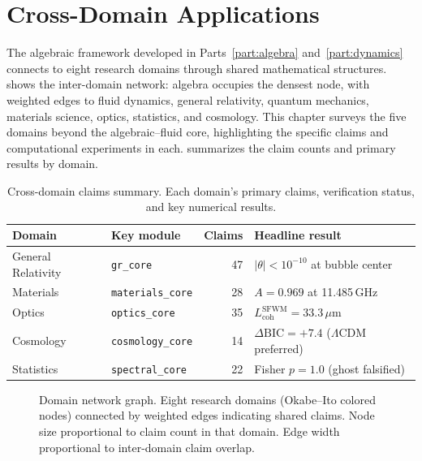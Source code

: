 \documentclass[12pt,openany]{report}
\theoremstyle{definition}
\theoremstyle{plain}
\theoremstyle{remark}
\begin{document}
\chapter{Cross-Domain Applications}
\label{ch:domains}

The algebraic framework developed in Parts~\ref{part:algebra}
and~\ref{part:dynamics} connects to eight research domains through
shared mathematical structures.   shows the
inter-domain network: algebra occupies the densest node, with weighted
edges to fluid dynamics, general relativity, quantum mechanics,
materials science, optics, statistics, and cosmology.  This chapter
surveys the five domains beyond the algebraic--fluid core, highlighting
the specific claims and computational experiments in each.
 summarizes the claim counts and primary
results by domain.

\begin{table}[htbp]
\centering
\caption{Cross-domain claims summary.  Each domain's primary claims,
verification status, and key numerical results.}
\label{tab:domain-summary}
\begin{tabular}{llrl}
\toprule
\textbf{Domain} & \textbf{Key module} & \textbf{Claims} & \textbf{Headline result} \\
\midrule
General Relativity & \texttt{gr\_core} & 47 &
  $|\theta| < 10^{-10}$ at bubble center \\
Materials & \texttt{materials\_core} & 28 &
  $A = 0.969$ at 11.485\,GHz \\
Optics & \texttt{optics\_core} & 35 &
  $L_{\mathrm{coh}}^{\mathrm{SFWM}} = 33.3\,\mu$m \\
Cosmology & \texttt{cosmology\_core} & 14 &
  $\Delta\mathrm{BIC} = +7.4$ ($\Lambda$CDM preferred) \\
Statistics & \texttt{spectral\_core} & 22 &
  Fisher $p = 1.0$ (ghost falsified) \\
\bottomrule
\end{tabular}
\end{table}

\begin{figure}[htbp]
\centering

\caption{Domain network graph.  Eight research domains (Okabe--Ito
colored nodes) connected by weighted edges indicating shared claims.
Node size proportional to claim count in that domain.  Edge width
proportional to inter-domain claim overlap.}
\label{fig:domain-network}
\end{figure}
\end{document}
